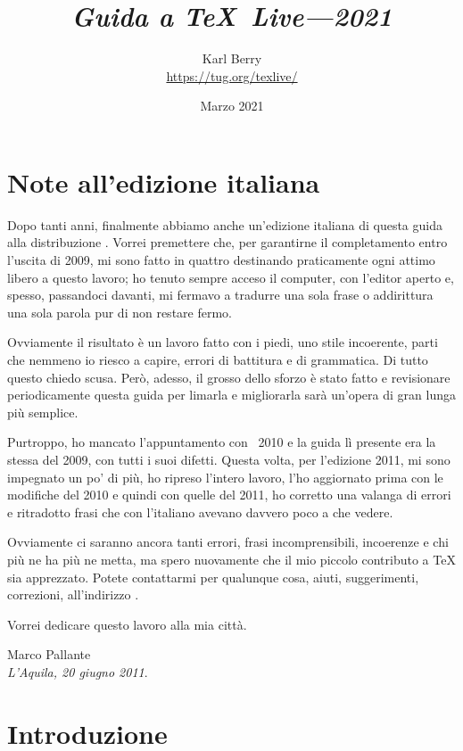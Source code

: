 \documentclass{article}
\title{%
  {\huge \textit{Guida a \TeX\ Live---2021}}
}
\author{Karl Berry\\[3mm]
        \url{https://tug.org/texlive/}
       }
\date{Marzo 2021}
\begin{document}
\maketitle

\begin{multicols}{2}
\tableofcontents
\end{multicols}


\section*{Note all'edizione italiana}

Dopo tanti anni, finalmente abbiamo anche un'edizione italiana di questa
guida alla distribuzione \TL. Vorrei premettere che, per garantirne il
completamento entro l'uscita di \TL{} 2009, mi sono fatto in quattro
destinando praticamente ogni attimo libero a questo lavoro; ho tenuto
sempre acceso il computer, con l'editor aperto e, spesso, passandoci
davanti, mi fermavo a tradurre una sola frase o addirittura una sola
parola pur di non restare fermo.

Ovviamente il risultato è un lavoro fatto con i piedi, uno stile
incoerente, parti che nemmeno io riesco a capire, errori di battitura e di
grammatica. Di tutto questo chiedo scusa. Però, adesso, il grosso dello
sforzo è stato fatto e revisionare periodicamente questa guida per limarla
e migliorarla sarà un'opera di gran lunga più semplice.

Purtroppo, ho mancato l'appuntamento con \TL\ 2010 e la guida lì presente
era la stessa del 2009, con tutti i suoi difetti. Questa volta, per
l'edizione 2011, mi sono impegnato un po' di più, ho ripreso l'intero
lavoro, l'ho aggiornato prima con le modifiche del 2010 e quindi con quelle
del 2011, ho corretto una valanga di errori e ritradotto frasi che con
l'italiano avevano davvero poco a che vedere.

Ovviamente ci saranno ancora tanti errori, frasi incomprensibili, incoerenze
e chi più ne ha più ne metta, ma spero nuovamente che il mio piccolo
contributo a \TeX{} sia apprezzato. Potete contattarmi per qualunque cosa,
aiuti, suggerimenti, correzioni, all'indirizzo
.

Vorrei dedicare questo lavoro alla mia città.

\bigskip

\noindent Marco Pallante\\
\emph{L'Aquila, 20 giugno 2011}.


\section{Introduzione}
\label{sec:intro}
\end{document}
